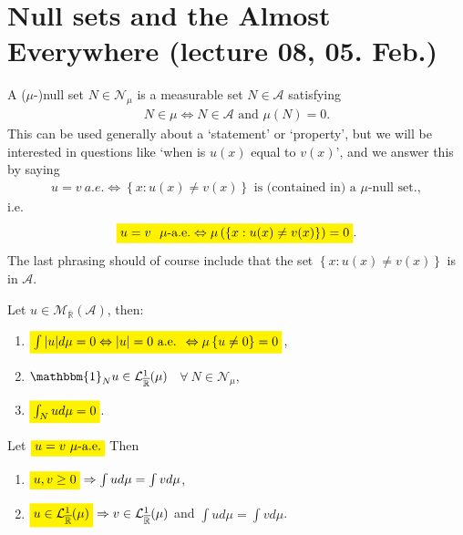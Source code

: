 \section{Null sets and the Almost Everywhere (lecture 08, 05. Feb.)}
\begin{definition}
    A (\(\mu\)-)null set \(N\in\mathcal{N}_{\mu}\) is a measurable set \(N\in\mathscr{A}\) satisfying
    \begin{align}
        N\in\mathcal{\mu} \Leftrightarrow N\in\mathscr{A} \text{ and } \mu(N) = 0.
    \end{align}
    This can be used generally about a `statement' or `property', but we will be interested in questions like 
    `when is \(u(x)\) equal to \(v(x)\)', and we answer this by saying
    \begin{align}
        u=v \ a.e. \Leftrightarrow \left\{ x: u(x) \neq v(x) \right\} \text{ is (contained in) a }\mu\text{-null set.}, 
    \end{align}
    i.e.
    \begin{align}
        \highlight[yellow]{u=v \ \  \mu\text{-a.e.} \Leftrightarrow \mu\left( \left\{ x: u(x) \neq v(x) \right\} \right) = 0}.
    \end{align}
    The last phrasing should of course include that the set \( \left\{ x: u(x) \neq v(x) \right\}\) is in \(\mathscr{A}\).
\end{definition}
\begin{theorem}
    Let \(u\in \mathcal{M}_{\overline{\mathbb{R}}}(\mathscr{A})\), then:
    \begin{enumerate}[label=(\roman*)]
        \item \(\highlight[yellow]{\int\vert u\vert d\mu = 0 \Leftrightarrow \vert u\vert = 0 \text{ a.e. } \Leftrightarrow \mu\left\{u\neq0\right\} = 0}\),
        \item \(\mathbbm{1}_{N}u\in \mathcal{L}^{1}_{\overline{\mathbb{R}}}(\mu)\) \ \(\forall \ N\in\mathcal{N}_{\mu}\),
        \item \(\highlight[yellow]{\int_Nud\mu = 0}\).
    \end{enumerate}
\end{theorem}
\begin{corollary}
    Let \(\highlight[yellow]{u=v \ \mu \text{-a.e.}}\) Then
    \begin{enumerate}[label=(\roman*)]
        \item \(\highlight[yellow]{u,v \geq 0} \Rightarrow \int ud\mu = \int vd\mu\),
        \item \(\highlight[yellow]{u\in\mathcal{L}^{1}_{\overline{\mathbb{R}}}(\mu)} \Rightarrow v\in\mathcal{L}^{1}_{\overline{\mathbb{R}}}(\mu)\) and \(\int ud\mu = \int vd\mu\).
    \end{enumerate}
\end{corollary}
